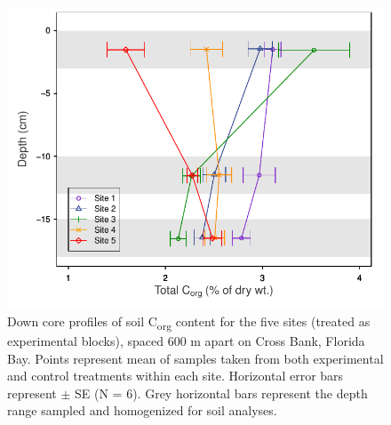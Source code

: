 \begin{figure}
  \centering
  \includegraphics[width=.95\textwidth]{Figures/chapter1/fig8}
\caption[Down core profiles of soil C\textsubscript{org} content for the five sites]{Down core profiles of soil C\textsubscript{org} content for the five sites (treated as experimental blocks), spaced 600 m apart on Cross Bank, Florida Bay. Points represent mean of samples taken from both experimental and control treatments within each site. Horizontal error bars represent $\pm$ SE (N = 6). Grey horizontal bars represent the depth range sampled and homogenized for soil analyses.}
  \label{fig:1fig8}
\end{figure}

